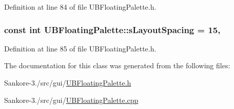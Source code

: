 Definition at line 84 of file U\-B\-Floating\-Palette.\-h.

\hypertarget{class_u_b_floating_palette_ac78ed632e01f218be6aa7201e0ac4e3f}{
\subsubsection[{s\-Layout\-Spacing}]{\setlength{\rightskip}{0pt plus 5cm}const int U\-B\-Floating\-Palette\-::s\-Layout\-Spacing = 15\hspace{0.3cm}{\ttfamily [static]}, {\ttfamily [protected]}}}\label{d1/d97/class_u_b_floating_palette_ac78ed632e01f218be6aa7201e0ac4e3f}


Definition at line 85 of file U\-B\-Floating\-Palette.\-h.



The documentation for this class was generated from the following files\-:\begin{DoxyCompactItemize}
\item 
Sankore-\/3./src/gui/\hyperlink{_u_b_floating_palette_8h}{U\-B\-Floating\-Palette.\-h}\item 
Sankore-\/3./src/gui/\hyperlink{_u_b_floating_palette_8cpp}{U\-B\-Floating\-Palette.\-cpp}\end{DoxyCompactItemize}
